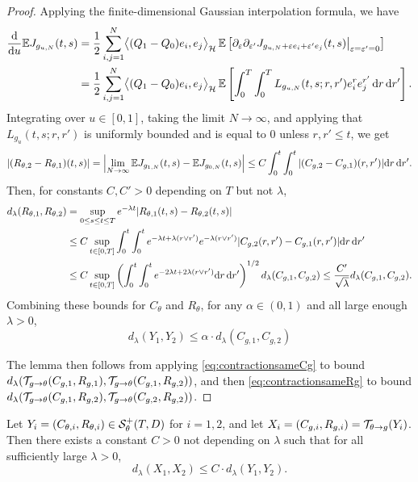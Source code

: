 \begin{proof}
Applying the finite-dimensional Gaussian interpolation formula, we have
\begin{align*}
    \frac{\mathrm{d}}{\mathrm{d} u}\mathbb{E} J_{g_{u,N}}(t,s)
    &=
    \frac12
    \sum_{i,j=1}^N
    \bigl\langle (Q_1-Q_0)e_i,e_j\bigr\rangle_{\mathcal{H}}
    \,
    \mathbb{E}\left[
        \partial_\varepsilon \partial_{\varepsilon'}J_{g_{u,N}+\varepsilon e_i+\varepsilon'
e_j}(t,s)\big|_{\varepsilon=\varepsilon'=0}
    \right]
    \\
    &=
    \frac12
    \sum_{i,j=1}^N
    \bigl\langle (Q_1-Q_0)e_i,e_j\bigr\rangle_{\mathcal{H}}
    \,
    \mathbb{E}\left[
        \int_0^T\int_0^T
        L_{g_{u,N}}(t,s;r,r')
        e_i^re_j^{r'}
        \,\mathrm{d} r\,\mathrm{d} r'
    \right].
\end{align*}
Integrating over $u \in [0,1]$, taking the limit $N \to \infty$, and applying
that $L_{g_u}(t,s;r,r')$ is uniformly bounded and is equal to 0 unless
$r,r' \leq t$, we get
\[|(R_{\theta,2}-R_{\theta,1})(t,s)|
=\left|\lim_{N \to \infty} \mathbb{E} J_{g_{1,N}}(t,s)-\mathbb{E} J_{g_{0,N}}(t,s)\right|
\leq C \int_0^t\int_0^t
|(C_{g,2}-C_{g,1})(r,r')|\mathrm{d} r\,\mathrm{d} r'.
\]
Then, for constants $C,C'>0$ depending on $T$ but not $\lambda$,
\begin{align*}
d_\lambda(R_{\theta,1},R_{\theta,2})
&=\sup_{0 \leq s \leq t \leq T}
e^{-\lambda t}|R_{\theta,1}(t,s)-R_{\theta,2}(t,s)|\\
&\leq C\sup_{t \in [0,T]}
\int_0^t\int_0^t
e^{-\lambda t+\lambda(r \vee r')}
e^{-\lambda (r \vee r')}|C_{g,2}(r,r')-C_{g,1}(r,r')|\mathrm{d} r\,\mathrm{d} r'\\
&\leq C\sup_{t \in [0,T]}
\left(\int_0^t \int_0^t
e^{-2\lambda t+2\lambda(r \vee r')} \mathrm{d} r\,\mathrm{d} r'\right)^{1/2}
d_\lambda(C_{g,1},C_{g,2}) \leq
\frac{C'}{\sqrt{\lambda}}d_\lambda(C_{g,1},C_{g,2}).
\end{align*}
Combining these bounds for $C_\theta$ and $R_\theta$,
for any $\alpha \in (0,1)$ and all large enough $\lambda>0$,
\begin{equation}\label{eq:contractionsameRg}
d_\lambda(Y_1,Y_2) \leq \alpha \cdot d_\lambda(C_{g,1},C_{g,2})
\end{equation}

The lemma then follows from applying \eqref{eq:contractionsameCg} to bound
$d_\lambda(\mathcal{T}_{g \to \theta}(C_{g,1},R_{g,1}),
\mathcal{T}_{g \to \theta}(C_{g,1},R_{g,2}))$, and then
\eqref{eq:contractionsameRg} to bound
$d_\lambda(\mathcal{T}_{g \to \theta}(C_{g,1},R_{g,2}),
\mathcal{T}_{g \to \theta}(C_{g,2},R_{g,2}))$.
\end{proof}

\begin{lemma}
\label{lem:contraction-Lipschitz}
    Let $Y_i=(C_{\theta,i},R_{\theta,i}) \in \mathcal{S}_\theta^+(T,D)$ for $i=1,2$, and
let $X_i=(C_{g,i},R_{g,i})=\mathcal{T}_{\theta\to g}(Y_i)$. Then there exists a constant
$C>0$ not depending on $\lambda$ such that for all sufficiently large
$\lambda>0$, 
    \[
    d_\lambda(X_1,X_2) \leq C\cdot d_\lambda(Y_1,Y_2).
    \]
\end{lemma}

